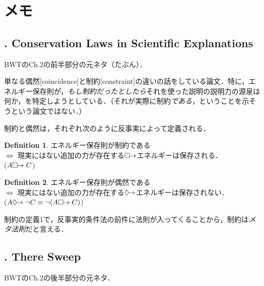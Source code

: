 \documentclass[twoside,11pt,uplatex]{jsarticle}
\theoremstyle{definition}
\newtheorem{dfn}{Definition}
\begin{document}
\section{メモ}
\cite{Lange2009a,Lange2009b,Lange2010,Lange2011,Lange2012,Lange2013a,Lange2013b,Lange2013c,Lange2014,Lange2015,Lange2016,Lange2018a,Lange2018b}

\subsection{\cite{Lange2011}. Conservation Laws in Scientific Explanations}
BWTのCh.2の前半部分の元ネタ（たぶん）．

単なる偶然[coincidence]と制約[constraint]の違いの話をしている論文．特に，エネルギー保存則が，\emph{もし制約だったとしたら}それを使った説明の説明力の源泉は何か，を特定しようとしている．（それが実際に制約\emph{である}，ということを示そうという論文ではない．）


制約と偶然は，それぞれ次のように反事実によって定義される．
\begin{dfn}
エネルギー保存則が制約である\\
$\Longleftrightarrow$
現実にはない追加の力が存在する$\Box\hspace{-4pt}\rightarrow$エネルギーは保存される．\\
($A\Box\hspace{-4pt}\rightarrow C$)
\end{dfn}
\begin{dfn}
エネルギー保存則が偶然である\\
$\Longleftrightarrow$
現実にはない追加の力が存在する$\Diamond\hspace{-4pt}\rightarrow$エネルギーは保存されない．\\
($A\Diamond\hspace{-4pt}\rightarrow\lnot C\equiv \lnot(A\Box\hspace{-4pt}\rightarrow C)$)
\end{dfn}
制約の定義1で，反事実的条件法の前件に法則が入ってくることから，制約は\emph{メタ法則}だと言える\citep[170]{Lange2012}．

\subsection{\cite{Lange2012}. There Sweep}
BWTのCh.2の後半部分の元ネタ．
\end{document}
